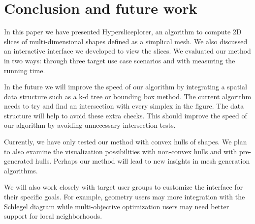 \section{Conclusion and future work}
\label{sec:conclusion}

In this paper we have presented Hypersliceplorer, an algorithm to compute
2D slices of multi-dimensional shapes defined as a simplical mesh. 
We also discussed an interactive interface we developed to view the slices.
We evaluated our method in two ways: through three target use case scenarios
and with measuring the running time.

In the future we will improve the speed of our algorithm by integrating a
spatial data structure such as a k-d tree or bounding box method. The current
algorithm needs to try and find an intersection with every simplex in the figure.
The data structure will help to avoid these extra checks. This should
improve the speed of our algorithm by avoiding unnecessary intersection tests.

Currently, we have only tested our method with convex hulls of shapes. We
plan to also examine the visualization possibilities with non-convex hulls
and with pre-generated hulls. Perhaps our method will lead to new insights
in mesh generation algorithms.

We will also work closely with target user groups to customize the interface
for their specific goals. For example, geometry users may more integration with
the Schlegel diagram while multi-objective optimization users may need better
support for local neighborhoods.


